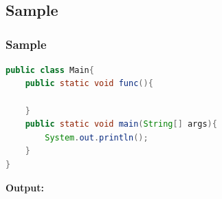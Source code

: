 \documentclass[12pt , a4paper]{article}
\begin{document}
%
%
\section{}
	\subsection{Sample}

	\subsubsection{Sample}

	\begin{problemDefBox}

	\end{problemDefBox} 

	\begin{lstlisting}[language=Java]
public class Main{
	public static void func(){

	}
	public static void main(String[] args){	
		System.out.println();		
	}
}		
	\end{lstlisting}

	\begin{tcolorbox}
	\textbf{Output:}\\

	\end{tcolorbox}


\end{document}
